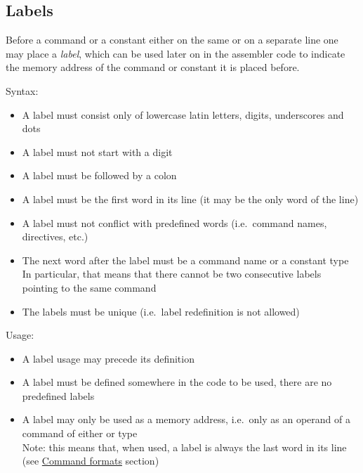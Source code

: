 \hypertarget{labels}{
    \subsection{Labels}
}

Before a command or a constant either on the same or on a separate line
one may place a \textit{label}, which can be used later on in
the assembler code to indicate the memory address of
the command or constant it is placed before.

Syntax:

\begin{itemize}
    \item A label must consist only of lowercase latin letters, digits,
    underscores and dots

    \item A label must not start with a digit

    \item A label must be followed by a colon

    \item A label must be the first word in its line
    (it may be the only word of the line)

    \item A label must not conflict with predefined words
    (i.e.\ command names, directives, etc.)

    \item The next word after the label must be a command name or
    a constant type\\
    In particular, that means that there cannot be two consecutive
    labels pointing to the same command

    \item The labels must be unique (i.e.\ label redefinition is not allowed)
\end{itemize}

Usage:

\begin{itemize}
    \item A label usage may precede its definition

    \item A label must be defined somewhere in the code to be used,
    there are no predefined labels

    \item A label may only be used as a memory address, i.e.\ only as
    an operand of a command of either  or  type \\
    Note: this means that, when used, a label is always the last word in
    its line (see \hyperlink{command:formats}{Command formats} section)
\end{itemize}
